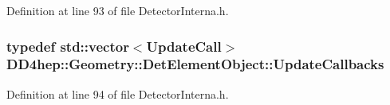 Definition at line 93 of file DetectorInterna.h.\hypertarget{class_d_d4hep_1_1_geometry_1_1_det_element_object_aa3bda3e351cc13f5bcce906a67d21872}{
\subsubsection[{UpdateCallbacks}]{\setlength{\rightskip}{0pt plus 5cm}typedef std::vector$<${\bf UpdateCall}$>$ {\bf DD4hep::Geometry::DetElementObject::UpdateCallbacks}}}
\label{class_d_d4hep_1_1_geometry_1_1_det_element_object_aa3bda3e351cc13f5bcce906a67d21872}


Definition at line 94 of file DetectorInterna.h.

